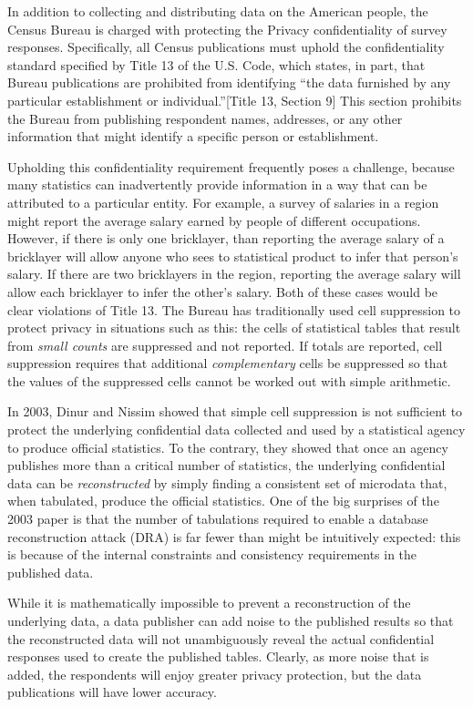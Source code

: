 \documentclass[runningheads]{llncs}
\begin{document}
In addition to collecting and distributing data on the American
people, the Census Bureau is charged with protecting the Privacy confidentiality of
survey responses. Specifically, all Census publications must uphold the
confidentiality standard specified by Title 13 of the U.S. Code, which
states, in part, that Bureau publications are prohibited from
identifying ``the data furnished by any particular
establishment or individual.''[Title 13, Section 9] This section
prohibits the Bureau from publishing respondent names, addresses, or any other
information that might identify a specific person or establishment.

Upholding this confidentiality requirement frequently poses a
challenge, because many statistics can inadvertently provide
information in a way that can be attributed to a particular
entity. For example, a survey of salaries in a region might report the
average salary earned by people of different occupations. However, if
there is only one bricklayer, than reporting the average salary of a
bricklayer will allow anyone who sees to statistical product to infer
that person's salary. If there are two bricklayers in the region,
reporting the average salary will allow each bricklayer to infer the
other's salary. Both of these cases would be clear violations of Title
13. The Bureau has traditionally used cell suppression to protect
privacy in situations such as this: the cells of statistical tables
that result from \emph{small counts} are suppressed and not
reported. If totals are reported, cell suppression requires that
additional \emph{complementary} cells be suppressed so that the values
of the suppressed cells cannot be worked out with simple arithmetic. 

In 2003, Dinur and Nissim showed that simple cell
suppression is not sufficient to protect the underlying confidential
data collected and used by a statistical agency to produce official
statistics\cite{DinurNissim2003}. To the contrary, they showed that
once an agency publishes more than a critical number of statistics,
the underlying confidential data can be \emph{reconstructed} by simply
finding a consistent set of microdata that, when tabulated, produce
the official statistics. One of the big surprises of the 2003 paper is
that the number of tabulations required to enable a database reconstruction
attack (DRA) is far fewer than might be intuitively expected: this is
because of the internal constraints and consistency requirements
in the published data. 

While it is mathematically impossible to prevent a reconstruction of the
underlying data, a data publisher can add noise to the published
results so that the reconstructed data will not unambiguously reveal the actual
confidential responses used to create the published
tables. Clearly, as more noise that is added, the respondents will
enjoy greater privacy protection, but the data publications will have
lower accuracy. 
\end{document}
